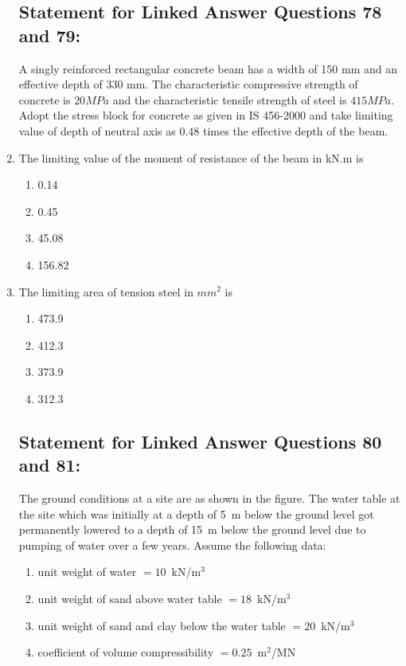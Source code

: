 \documentclass[journal,12pt,onecolumn]{IEEEtran}
\theoremstyle{remark}
\begin{document}
\begin{enumerate}
\subsection*{Statement for Linked Answer Questions 78 and 79:}
A singly reinforced rectangular concrete beam has a width of 150 mm and an effective depth of 330 mm. The characteristic compressive strength of concrete is $20MPa$ and the characteristic tensile strength of steel is $415MPa$. Adopt the stress block for concrete as given in IS 456-2000 and take limiting value of depth of neutral axis as 0.48 times the effective depth of the beam.

\item The limiting value of the moment of resistance of the beam in kN.m is

\hfill{}
\begin{enumerate}
\item 0.14
\item 0.45
\item 45.08
\item 156.82
\end{enumerate}

\item The limiting area of tension steel in $mm^2$ is

\hfill{}
\begin{enumerate}
\item 473.9
\item 412.3
\item 373.9
\item 312.3
\end{enumerate}

\subsection*{Statement for Linked Answer Questions 80 and 81:}
The ground conditions at a site are as shown in the figure. The water table at the site which was initially at a depth of 5~m below the ground level got permanently lowered to a depth of 15~m below the ground level due to pumping of water over a few years. Assume the following data:

\begin{enumerate}
\item unit weight of water $= 10$~kN/m$^3$
\item unit weight of sand above water table $= 18$~kN/m$^3$
\item unit weight of sand and clay below the water table $= 20$~kN/m$^3$
\item coefficient of volume compressibility $= 0.25$~m$^2$/MN
\end{enumerate}


\end{enumerate}
\end{document}
